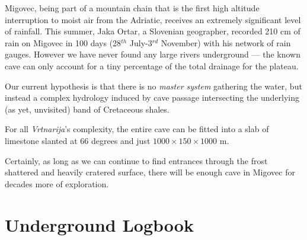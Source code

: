 Migovec, being part of a mountain chain that is the first high altitude
interruption to moist air from the Adriatic, receives an extremely
significant level of rainfall. This summer, Jaka Ortar, a Slovenian
geographer, recorded 210 cm of rain on Migovec in 100 days (28\(^{th}\)
July-3\(^{rd}\) November) with his network of rain gauges. However we
have never found any large rivers underground --- the known cave can
only account for a tiny percentage of the total drainage for the
plateau.

Our current hypothesis is that there is no \textit{master system}
gathering the water, but instead a complex hydrology induced by cave
passage intersecting the underlying (as yet, unvisited) band of
Cretaceous shales.

For all \emph{Vrtnarija}'s complexity, the entire cave can be fitted
into a slab of limestone slanted at 66 degrees and just
\(1000\times150\times1000\) m.

Certainly, as long as we can continue to find entrances through the
frost shattered and heavily cratered surface, there will be enough cave
in Migovec for decades more of exploration.

\hypertarget{underground-logbook}{%
\section{Underground Logbook}\label{underground-logbook}}



